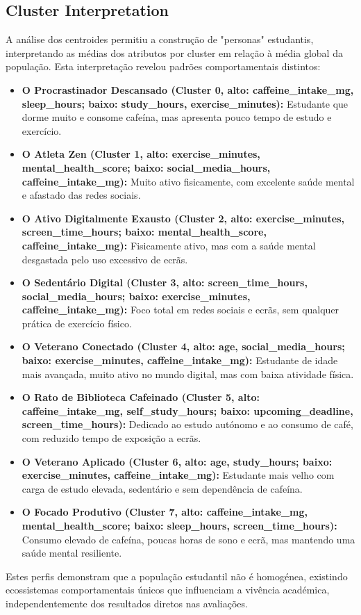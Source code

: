 \subsection{Cluster Interpretation}
A análise dos centroides permitiu a construção de "personas" estudantis, interpretando as médias dos atributos por cluster em relação à média global da população. Esta interpretação revelou padrões comportamentais distintos:
\sloppy
\begin{itemize}
    \item \textbf{O Procrastinador Descansado (Cluster 0, alto: caffeine\_intake\_mg, sleep\_hours; baixo: study\_hours, exercise\_minutes):} Estudante que dorme muito e consome cafeína, mas apresenta pouco tempo de estudo e exercício.
    \item \textbf{O Atleta Zen (Cluster 1, alto: exercise\_minutes, mental\_health\_score; baixo: social\_media\_hours, caffeine\_intake\_mg):} Muito ativo fisicamente, com excelente saúde mental e afastado das redes sociais.
    \item \textbf{O Ativo Digitalmente Exausto (Cluster 2, alto: exercise\_minutes, screen\_time\_hours; baixo: mental\_health\_score, caffeine\_intake\_mg):} Fisicamente ativo, mas com a saúde mental desgastada pelo uso excessivo de ecrãs.
    \item \textbf{O Sedentário Digital (Cluster 3, alto: screen\_time\_hours, social\_media\_hours; baixo: exercise\_minutes, caffeine\_intake\_mg):} Foco total em redes sociais e ecrãs, sem qualquer prática de exercício físico.
    \item \textbf{O Veterano Conectado (Cluster 4, alto: age, social\_media\_hours; baixo: exercise\_minutes, caffeine\_intake\_mg):} Estudante de idade mais avançada, muito ativo no mundo digital, mas com baixa atividade física.
    \item \textbf{O Rato de Biblioteca Cafeinado (Cluster 5, alto: caffeine\_intake\_mg, self\_study\_hours; baixo: upcoming\_deadline, screen\_time\_hours):} Dedicado ao estudo autónomo e ao consumo de café, com reduzido tempo de exposição a ecrãs.
    \item \textbf{O Veterano Aplicado (Cluster 6, alto: age, study\_hours; baixo: exercise\_minutes, caffeine\_intake\_mg):} Estudante mais velho com carga de estudo elevada, sedentário e sem dependência de cafeína.
    \item \textbf{O Focado Produtivo (Cluster 7, alto: caffeine\_intake\_mg, mental\_health\_score; baixo: sleep\_hours, screen\_time\_hours):} Consumo elevado de cafeína, poucas horas de sono e ecrã, mas mantendo uma saúde mental resiliente.
\end{itemize}
\fussy
Estes perfis demonstram que a população estudantil não é homogénea, existindo ecossistemas comportamentais únicos que influenciam a vivência académica, independentemente dos resultados diretos nas avaliações.